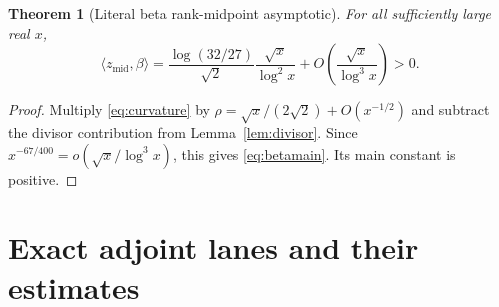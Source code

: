 \documentclass[10pt]{article}
\newtheorem{theorem}{Theorem}
\newcommand{\ip}[2]{\langle #1,#2\rangle}
\newcommand{\zm}{z_{\mathrm{mid}}}
\begin{document}
\begin{theorem}[Literal beta rank-midpoint asymptotic]\label{thm:beta}
For all sufficiently large real $x$,
\begin{equation}
 \boxed{\displaystyle
 \ip{\zm}{\beta}
 =\frac{\log(32/27)}{\sqrt2}\frac{\sqrt{x}}{\log^2x}
  +O\!\left(\frac{\sqrt{x}}{\log^3x}\right)>0.}      \label{eq:betamain}
\end{equation}
\end{theorem}

\begin{proof}
Multiply \eqref{eq:curvature} by
$\rho=\sqrt{x}/(2\sqrt2)+O(x^{-1/2})$ and subtract the divisor contribution
from Lemma~\ref{lem:divisor}.  Since
$x^{-67/400}=o(\sqrt{x}/\log^3x)$, this gives \eqref{eq:betamain}.
Its main constant is positive.
\end{proof}

\section{Exact adjoint lanes and their estimates}
\end{document}
